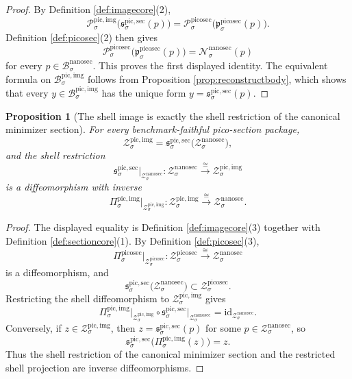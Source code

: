 \documentclass[11pt]{article}
\newcommand{\NanoSectionBody}[1]{\mathcal B_{#1}^{\mathrm{nanosec}}}
\newcommand{\NanoSectionFunctional}[1]{\mathscr N_{#1}^{\mathrm{nanosec}}}
\newcommand{\NanoSectionShell}[1]{\mathcal Z_{#1}^{\mathrm{nanosec}}}
\newcommand{\PicoSectionProj}[1]{\Pi_{#1}^{\mathrm{picosec}}}
\newcommand{\PicoSectionNanoMin}[1]{\mathfrak p_{#1}^{\mathrm{picosec}}}
\newcommand{\PicoSectionFunctional}[1]{\mathscr P_{#1}^{\mathrm{picosec}}}
\newcommand{\PicoSectionShell}[1]{\mathcal Z_{#1}^{\mathrm{picosec}}}
\newcommand{\PicoImgBody}[1]{\mathcal B_{#1}^{\mathrm{pic,img}}}
\newcommand{\PicoImgProj}[1]{\Pi_{#1}^{\mathrm{pic,img}}}
\newcommand{\PicoImgFunctional}[1]{\mathscr P_{#1}^{\mathrm{pic,img}}}
\newcommand{\PicoImgShell}[1]{\mathcal Z_{#1}^{\mathrm{pic,img}}}
\newcommand{\PicoMinSection}[1]{\mathfrak s_{#1}^{\mathrm{pic,sec}}}
\newtheorem{proposition}{Proposition}
\begin{document}
\begin{proof}
By Definition \ref{def:imagecore}(2),
\[
\PicoImgFunctional{\sigma}\bigl(\PicoMinSection{\sigma}(p)\bigr)
=
\PicoSectionFunctional{\sigma}\bigl(\PicoSectionNanoMin{\sigma}(p)\bigr).
\]
Definition \ref{def:picosec}(2) then gives
\[
\PicoSectionFunctional{\sigma}\bigl(\PicoSectionNanoMin{\sigma}(p)\bigr)
=
\NanoSectionFunctional{\sigma}(p)
\]
for every \(p\in\NanoSectionBody{\sigma}\). This proves the first displayed identity. The equivalent formula on \(\PicoImgBody{\sigma}\) follows from Proposition \ref{prop:reconstructbody}, which shows that every \(y\in\PicoImgBody{\sigma}\) has the unique form \(y=\PicoMinSection{\sigma}(p)\).
\end{proof}

\begin{proposition}[The shell image is exactly the shell restriction of the canonical minimizer section]
\label{prop:reconstructshell}
For every benchmark-faithful pico-section package,
\[
\PicoImgShell{\sigma}
=
\PicoMinSection{\sigma}\bigl(\NanoSectionShell{\sigma}\bigr),
\]
and the shell restriction
\[
\PicoMinSection{\sigma}\big|_{\NanoSectionShell{\sigma}}
:
\NanoSectionShell{\sigma}\xrightarrow{\cong}\PicoImgShell{\sigma}
\]
is a diffeomorphism with inverse
\[
\PicoImgProj{\sigma}\big|_{\PicoImgShell{\sigma}}
:
\PicoImgShell{\sigma}\xrightarrow{\cong}\NanoSectionShell{\sigma}.
\]
\end{proposition}

\begin{proof}
The displayed equality is Definition \ref{def:imagecore}(3) together with Definition \ref{def:sectioncore}(1). By Definition \ref{def:picosec}(3),
\[
\PicoSectionProj{\sigma}\big|_{\PicoSectionShell{\sigma}}
:
\PicoSectionShell{\sigma}\xrightarrow{\cong}\NanoSectionShell{\sigma}
\]
is a diffeomorphism, and
\[
\PicoMinSection{\sigma}\bigl(\NanoSectionShell{\sigma}\bigr)
\subset
\PicoSectionShell{\sigma}.
\]
Restricting the shell diffeomorphism to \(\PicoImgShell{\sigma}\) gives
\[
\PicoImgProj{\sigma}\big|_{\PicoImgShell{\sigma}}
\circ
\PicoMinSection{\sigma}\big|_{\NanoSectionShell{\sigma}}
=
\mathrm{id}_{\NanoSectionShell{\sigma}}.
\]
Conversely, if \(z\in\PicoImgShell{\sigma}\), then \(z=\PicoMinSection{\sigma}(p)\) for some \(p\in\NanoSectionShell{\sigma}\), so
\[
\PicoMinSection{\sigma}\bigl(\PicoImgProj{\sigma}(z)\bigr)
=
z.
\]
Thus the shell restriction of the canonical minimizer section and the restricted shell projection are inverse diffeomorphisms.
\end{proof}
\end{document}
